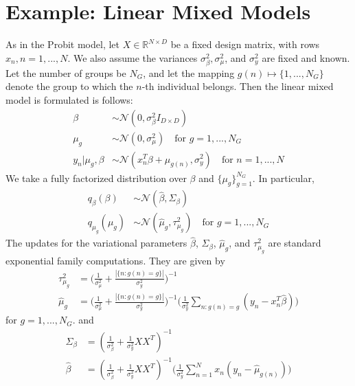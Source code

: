 \documentclass{article}
\begin{document}
\section{Example: Linear Mixed Models} 
As in the Probit model, let $X\in \mathbb{R}^{N\times D}$ be a fixed design matrix, with rows $x_n, n = 1,..., N$. We also assume the variances $\sigma^2_\beta, \sigma^2_\mu$, and $\sigma^2_y$ are fixed and known. Let the number of groups be $N_G$, and let the mapping $g(n)\mapsto \{1, ..., N_G\}$ denote the group to which the $n$-th individual belongs. Then the linear mixed model is formulated is follows: 
\begin{align}
\beta &\sim \mathcal N(0, \sigma^2_\beta I_{D\times D})\\
\mu_g &\sim \mathcal N(0, \sigma^2_\mu) \quad \text{for $g= 1, ..., N_G$} \\
y_n | \mu_g, \beta &\sim \mathcal N (x_n^T\beta + \mu_{g(n)}, \sigma^2_y)\quad \text{for $n = 1, ..., N$}
\end{align}
We take a fully factorized distribution over $\beta$ and $\{\mu_g\}_{g=1}^{N_G}$. In particular, 
\begin{align}
q_\beta(\beta) &\sim \mathcal N (\hat \beta, \Sigma_\beta)\\
q_{\mu_g}(\mu_g) &\sim \mathcal{N}(\hat\mu_g, \tau^2_{\mu_g}) \quad \text{for }g = 1, ..., N_G
\end{align}
The updates for the variational parameters $\hat\beta$, $\Sigma_\beta$, $\hat\mu_g$, and $\tau^2_{\mu_g}$ are standard exponential family computations. They are given by 
\begin{align}
{\tau^2_{\mu_g}} &= \Big(\frac{1}{\sigma^2_\mu} + \frac{|\{n : g(n) = g\}|}{\sigma^2_y}\Big)^{-1}\\
{\hat\mu_g} &= \Big(\frac{1}{\sigma^2_\mu} + \frac{|\{n : g(n) = g\}|}{\sigma^2_y}\Big)^{-1}\Big(\frac{1}{\sigma^2_y}\sum_{n: g(n) = g} (y_n - x_n^T\hat\beta)\Big)
\end{align}
for $g = 1, ..., N_G$. and 
\begin{align}
\Sigma_\beta &= (\frac{1}{\sigma^2_\beta} + \frac{1}{\sigma^2_y}XX^T)^{-1}\\
\hat\beta &= (\frac{1}{\sigma^2_\beta} + \frac{1}{\sigma^2_y}XX^T)^{-1}\Big(\frac{1}{\sigma^2_y}\sum_{n=1}^N  x_n(y_n - \hat\mu_{g(n)} )\Big)
\end{align}
\end{document}
